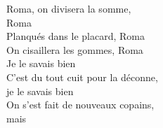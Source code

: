 Roma, on divisera la somme, \\
Roma \\
Planqués dans le placard, Roma \\
On cisaillera les gommes, Roma \\
Je le savais bien \\
C'est du tout cuit pour la déconne, \\
je le savais bien \\
On s'est fait de nouveaux copains, \\
mais \\